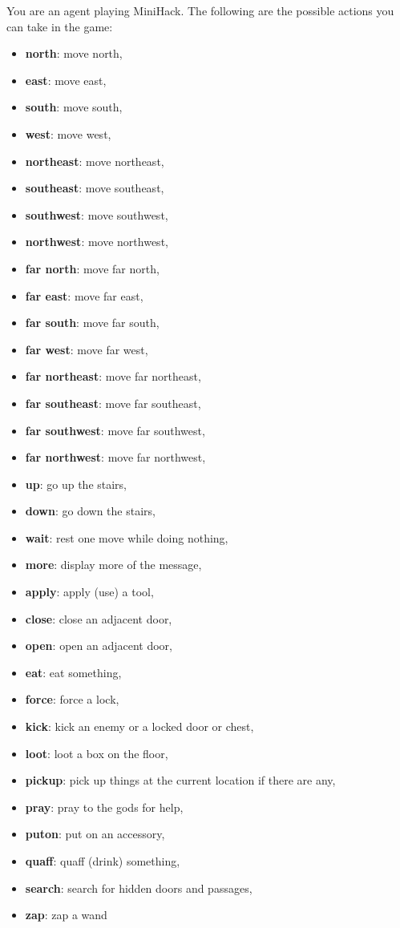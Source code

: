 \begin{MyGreenBox}[frametitle={\textbf{Iteration 2 MiniHack Prompt}}]
You are an agent playing MiniHack. The following are the possible actions you can take in the game:

\begin{itemize}
  \item \textbf{north}: move north,
  \item \textbf{east}: move east,
  \item \textbf{south}: move south,
  \item \textbf{west}: move west,
  \item \textbf{northeast}: move northeast,
  \item \textbf{southeast}: move southeast,
  \item \textbf{southwest}: move southwest,
  \item \textbf{northwest}: move northwest,
  \item \textbf{far north}: move far north,
  \item \textbf{far east}: move far east,
  \item \textbf{far south}: move far south,
  \item \textbf{far west}: move far west,
  \item \textbf{far northeast}: move far northeast,
  \item \textbf{far southeast}: move far southeast,
  \item \textbf{far southwest}: move far southwest,
  \item \textbf{far northwest}: move far northwest,
  \item \textbf{up}: go up the stairs,
  \item \textbf{down}: go down the stairs,
  \item \textbf{wait}: rest one move while doing nothing,
  \item \textbf{more}: display more of the message,
  \item \textbf{apply}: apply (use) a tool,
  \item \textbf{close}: close an adjacent door,
  \item \textbf{open}: open an adjacent door,
  \item \textbf{eat}: eat something,
  \item \textbf{force}: force a lock,
  \item \textbf{kick}: kick an enemy or a locked door or chest,
  \item \textbf{loot}: loot a box on the floor,
  \item \textbf{pickup}: pick up things at the current location if there are any,
  \item \textbf{pray}: pray to the gods for help,
  \item \textbf{puton}: put on an accessory,
  \item \textbf{quaff}: quaff (drink) something,
  \item \textbf{search}: search for hidden doors and passages,
  \item \textbf{zap}: zap a wand
\end{itemize}


\end{MyGreenBox}
